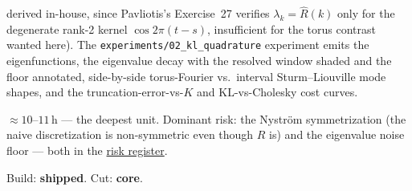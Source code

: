 \documentclass[11pt]{article}
\newenvironment{brief}{%
  \begin{description}[style=sameline,leftmargin=2.3cm,font=\bfseries\color{hubblue}]
}{%
  \end{description}
}
\begin{document}
\begin{brief}
derived in-house, since Pavliotis's Exercise~27 verifies $\lambda_k=\hat R(k)$ only for the
degenerate rank-2 kernel $\cos2\pi(t-s)$, insufficient for the torus contrast wanted here). The
\texttt{experiments/02\_kl\_quadrature} experiment emits the eigenfunctions, the eigenvalue decay with
the resolved window shaded and the floor annotated, side-by-side torus-Fourier vs.\ interval
Sturm--Liouville mode shapes, and the truncation-error-vs-$K$ and KL-vs-Cholesky cost curves.
\item[Effort \& risk] $\approx 10$--$11$\,h --- the deepest unit. Dominant risk: the Nystr\"om
symmetrization (the naive discretization is non-symmetric even though $R$ is) and the eigenvalue noise
floor --- both in the \hyperref[sec:risk]{risk register}.
\item[Status] Build: \textbf{shipped}. Cut: \textbf{core}.
\end{brief}

\end{document}
